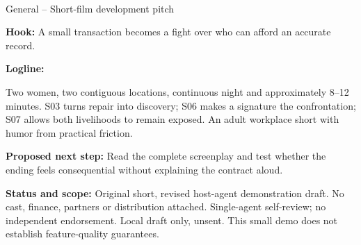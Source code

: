 \documentclass[11pt,letterpaper]{article}
\begin{document}
\begin{center}
{\Large\bfseries\sffamily \filmtitleupper}\\[6pt]
General -- Short-film development pitch
\end{center}
\textbf{Hook:} A small transaction becomes a fight over who can afford an accurate record.

\textbf{Logline:} \filmlogline

Two women, two contiguous locations, continuous night and approximately 8–12 minutes. S03 turns repair into discovery; S06 makes a signature the confrontation; S07 allows both livelihoods to remain exposed. An adult workplace short with humor from practical friction.

\textbf{Proposed next step:} Read the complete screenplay and test whether the ending feels consequential without explaining the contract aloud.

\textbf{Status and scope:} Original short, revised host-agent demonstration draft. No cast, finance, partners or distribution attached. Single-agent self-review; no independent endorsement. Local draft only, unsent. This small demo does not establish feature-quality guarantees.
\end{document}
